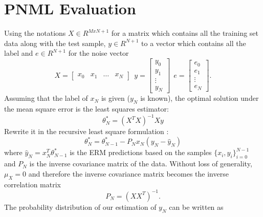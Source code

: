 \documentclass[conference,letterpaper]{IEEEtran}
\begin{document}
\section{PNML Evaluation} \label{sec:PNML_eval}
Using the notations $X \in R^{MxN+1}$ for a matrix which contains all the training set data along with the test sample, $y \in R^{N+1}$ to a vector which contains all the label and $e \in R^{N+1}$ for the noise vector
\begin{equation}
X = \begin{bmatrix} x_0 & x_1 & \dots & x_N \end{bmatrix}\ \ 
y = \begin{bmatrix} y_0 \\ y_1 \\ \vdots \\ y_N \end{bmatrix}\ \
e = \begin{bmatrix} e_0 \\ e_1 \\ \vdots \\ e_N  \end{bmatrix}.
\end{equation}
Assuming that the label of $x_N$ is given ($y_N$ is known), the optimal solution under the mean square error is the least squares estimator:
\begin{equation}
\theta ^*_N = (X^T X)^{-1} X y
\end{equation}
Rewrite it in the recursive least square formulation \cite{hayes19969}:
\begin{equation} \label{eq:rls_update}
\theta ^*_N = \theta^*_{N-1} - P_N x_N (y_N - \hat{y}_N)
\end{equation}
where $\hat{y}_N = x_N^T \theta ^*_{N-1}$ is the ERM predictions based on the samples $\{x_i, y_i\}_{i=0}^{N-1}$ and $P_N$ is the inverse covariance matrix of the data.
Without loss of generality, $\mu _{X} = 0$ and therefore the inverse covariance matrix becomes the inverse correlation matrix
\begin{equation}
P_N = (XX^T)^{-1}. 
\end{equation}
The probability distribution of our estimation of $y_N$ can be written as
\end{document}
